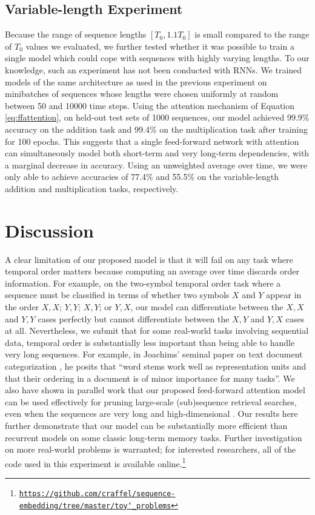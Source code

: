 \documentclass{article} %
\begin{document}
\subsection{Variable-length Experiment}

Because the range of sequence lengths $[T_0, 1.1T_0]$ is small compared to the range of $T_0$ values we evaluated, we further tested whether it was possible to train a single model which could cope with sequences with highly varying lengths.
To our knowledge, such an experiment has not been conducted with RNNs.
We trained models of the same architecture as used in the previous experiment on minibatches of sequences whose lengths were chosen uniformly at random between 50 and 10000 time steps.
Using the attention mechanism of Equation \ref{eq:ffattention}, on held-out test sets of 1000 sequences, our model achieved 99.9\% accuracy on the addition task and 99.4\% on the multiplication task after training for 100 epochs.
This suggests that a single feed-forward network with attention can simultaneously model both short-term and very long-term dependencies, with a marginal decrease in accuracy.
Using an unweighted average over time, we were only able to achieve accuracies of 77.4\% and 55.5\% on the variable-length addition and multiplication tasks, respectively.

\section{Discussion}
\label{sec:limitations}

A clear limitation of our proposed model is that it will fail on any task where temporal order matters because computing an average over time discards order information.
For example, on the two-symbol temporal order task \cite{hochreiter1997long} where a sequence must be classified in terms of whether two symbols $X$ and $Y$ appear in the order $X, X$; $Y, Y$; $X, Y$; or $Y, X$, our model can differentiate between the $X, X$ and $Y, Y$ cases perfectly but cannot differentiate between the $X, Y$ and $Y, X$ cases at all.
Nevertheless, we submit that for some real-world tasks involving sequential data, temporal order is substantially less important than being able to handle very long sequences.
For example, in Joachims' seminal paper on text document categorization \cite{joachims1998text}, he posits that ``word stems work well as representation units and that their ordering in a document is of minor importance for many tasks''.
We also have shown in parallel work that our proposed feed-forward attention model can be used effectively for pruning large-scale (sub)sequence retrieval searches, even when the sequences are very long and high-dimensional \cite{raffel2016pruning}.
Our results here further demonstrate that our model can be substantially more efficient than recurrent models on some classic long-term memory tasks.
Further investigation on more real-world problems is warranted; for interested researchers, all of the code used in this experiment is available online.\footnote{\href{https://github.com/craffel/sequence-embedding/tree/master/toy_problems}{\texttt{https://github.com/craffel/sequence-embedding/tree/master/toy\char`_problems}}}


\small

\end{document}
